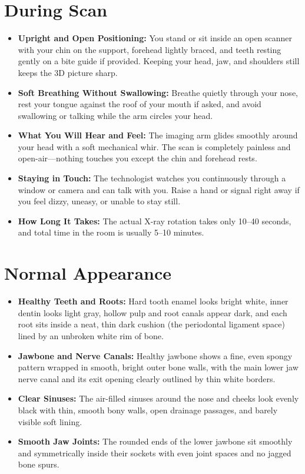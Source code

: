 \section{During Scan}
\begin{itemize}
    \item \textbf{Upright and Open Positioning:} You stand or sit inside an open scanner with your chin on the support, forehead lightly braced, and teeth resting gently on a bite guide if provided. Keeping your head, jaw, and shoulders still keeps the 3D picture sharp.
    \item \textbf{Soft Breathing Without Swallowing:} Breathe quietly through your nose, rest your tongue against the roof of your mouth if asked, and avoid swallowing or talking while the arm circles your head.
    \item \textbf{What You Will Hear and Feel:} The imaging arm glides smoothly around your head with a soft mechanical whir. The scan is completely painless and open-air---nothing touches you except the chin and forehead rests.
    \item \textbf{Staying in Touch:} The technologist watches you continuously through a window or camera and can talk with you. Raise a hand or signal right away if you feel dizzy, uneasy, or unable to stay still.
    \item \textbf{How Long It Takes:} The actual X-ray rotation takes only 10--40 seconds, and total time in the room is usually 5--10 minutes.
\end{itemize}

\section{Normal Appearance}
\begin{itemize}
    \item \textbf{Healthy Teeth and Roots:} Hard tooth enamel looks bright white, inner dentin looks light gray, hollow pulp and root canals appear dark, and each root sits inside a neat, thin dark cushion (the periodontal ligament space) lined by an unbroken white rim of bone.
    \item \textbf{Jawbone and Nerve Canals:} Healthy jawbone shows a fine, even spongy pattern wrapped in smooth, bright outer bone walls, with the main lower jaw nerve canal and its exit opening clearly outlined by thin white borders.
    \item \textbf{Clear Sinuses:} The air-filled sinuses around the nose and cheeks look evenly black with thin, smooth bony walls, open drainage passages, and barely visible soft lining.
    \item \textbf{Smooth Jaw Joints:} The rounded ends of the lower jawbone sit smoothly and symmetrically inside their sockets with even joint spaces and no jagged bone spurs.
\end{itemize}

